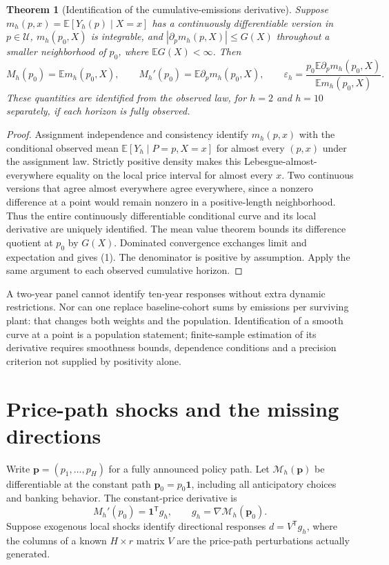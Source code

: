 \documentclass[11pt]{article}
\newtheorem{theorem}{Theorem}
\newcommand{\E}{\mathbb E}
\begin{document}
\begin{theorem}[Identification of the cumulative-emissions derivative]
Suppose $m_h(p,x)=\E[Y_h(p)\mid X=x]$ has a continuously differentiable
version in $p\in\mathcal U$, $m_h(p_0,X)$ is integrable, and
$|\partial_pm_h(p,X)|\leq G(X)$ throughout a smaller neighborhood of
$p_0$, where $\E G(X)<\infty$. Then
\[
 M_h(p_0)=\E m_h(p_0,X),\qquad
 M_h'(p_0)=\E\partial_pm_h(p_0,X),\qquad
 \varepsilon_h=\frac{p_0\E\partial_pm_h(p_0,X)}{\E m_h(p_0,X)}.       \tag{1}
\]
These quantities are identified from the observed law, for $h=2$ and
$h=10$ separately, if each horizon is fully observed.
\end{theorem}
\begin{proof}
Assignment independence and consistency identify
$m_h(p,x)$ with the conditional observed mean
$\E[Y_h\mid P=p,X=x]$ for almost every $(p,x)$ under the assignment law.
Strictly positive density makes this Lebesgue-almost-everywhere equality
on the local price interval for almost every $x$. Two continuous versions
that agree almost everywhere agree everywhere, since a nonzero difference
at a point would remain nonzero in a positive-length neighborhood.
Thus the entire continuously differentiable conditional curve and its
local derivative are uniquely identified. The mean value theorem bounds
its difference quotient at $p_0$ by $G(X)$. Dominated convergence exchanges
limit and expectation and gives (1). The denominator is positive by
assumption. Apply the same argument to each observed cumulative horizon.
\end{proof}

A two-year panel cannot identify ten-year responses without extra dynamic
restrictions. Nor can one replace baseline-cohort sums by emissions per
surviving plant: that changes both weights and the population. Identification
of a smooth curve at a point is a population statement; finite-sample
estimation of its derivative requires smoothness bounds, dependence
conditions and a precision criterion not supplied by positivity alone.

\section{Price-path shocks and the missing directions}
Write $\mathbf p=(p_1,\ldots,p_H)$ for a fully announced policy path.
Let $\mathcal M_h(\mathbf p)$ be differentiable at the constant path
$\mathbf p_0=p_0\boldsymbol1$, including all anticipatory choices and
banking behavior. The constant-price derivative is
\[
 M_h'(p_0)=\boldsymbol1^\mathsf T g_h,
 \qquad g_h=\nabla\mathcal M_h(\mathbf p_0).          \tag{2}
\]
Suppose exogenous local shocks identify directional responses
$d=V^\mathsf Tg_h$, where the columns of a known $H\times r$ matrix
$V$ are the price-path perturbations actually generated.
\end{document}
